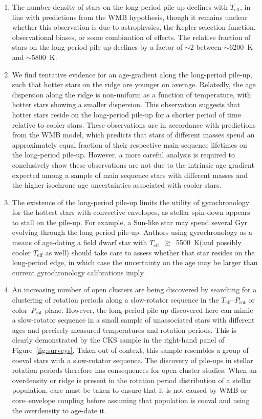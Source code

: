 \documentclass[trackchanges,twocolumn]{aastex631}
\newcommand{\teffmin}{5500~K\xspace}
\newcommand{\teff}{\ensuremath{T_{\mathrm{eff}}}\xspace}
\newcommand{\prot}{\ensuremath{P_\mathrm{rot}}\xspace}
\begin{document}
\begin{enumerate}
    \item The number density of stars on the long-period pile-up declines with \teff, in line with predictions from the WMB hypothesis, though it remains unclear whether this observation is due to astrophysics, the Kepler selection function, observational biases, or some combination of effects. The relative fraction of stars on the long-period pile up declines by a factor of $\sim$2 between $\sim$6200~K and $\sim$5800~K. 
    
    \item We find tentative evidence for an age-gradient along the long-period pile-up, such that hotter stars on the ridge are younger on average. Relatedly, the age dispersion along the ridge is non-uniform as a function of temperature, with hotter stars showing a smaller dispersion. This observation suggests that hotter stars reside on the long-period pile-up for a shorter period of time relative to cooler stars. These observations are in accordance with predictions from the WMB model, which predicts that stars of different masses spend an approximately equal fraction of their respective main-sequence lifetimes on the long-period pile-up. However, a more careful analysis is required to conclusively show these observations are not due to the intrinsic age gradient expected among a sample of main sequence stars with different masses and the higher isochrone age uncertainties associated with cooler stars.
    
    \item The existence of the long-period pile-up limits the utility of gyrochronology for the hottest stars with convective envelopes, as stellar spin-down appears to stall on the pile-up. For example, a Sun-like star may spend several Gyr evolving through the long-period pile-up. Authors using gyrochronology as a means of age-dating a field dwarf star with \teff~$\gtrsim$~\teffmin (and possibly cooler \teff as well) should take care to assess whether that star resides on the long-period edge, in which case the uncertainty on the age may be larger than current gyrochronology calibrations imply.
    
    \item An increasing number of open clusters are being discovered by searching for a clustering of rotation periods along a slow-rotator sequence in the \teff–\prot or color–\prot plane. However, the long-period pile up discovered here can mimic a slow-rotator sequence in a small sample of unassociated stars with different ages and precisely measured temperatures and rotation periods. This is clearly demonstrated by the CKS sample in the right-hand panel of Figure~\ref{fig:surveys}. Taken out of context, this sample resembles a group of coeval stars with a slow-rotator sequence. The discovery of pile-ups in stellar rotation periods therefore has consequences for open cluster studies. When an overdensity or ridge is present in the rotation period distribution of a stellar population, care must be taken to ensure that it is not caused by WMB or core–envelope coupling before assuming that population is coeval and using the overdensity to age-date it.
    
\end{enumerate}
\end{document}
